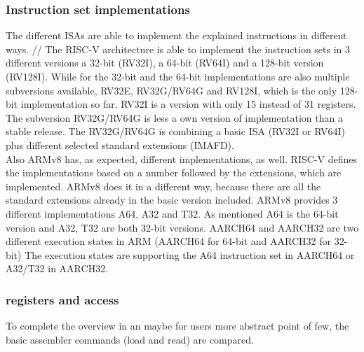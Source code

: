 \documentclass[conference]{IEEEtran}
\begin{document}
\subsubsection{Instruction set implementations}
The different \glspl{ISA} are able to implement the explained instructions in different ways.
// The RISC-V architecture is able to implement the instruction sets in 3 different versions a 32-bit (RV32I), a 64-bit (RV64I) and a 128-bit version (RV128I).
While for the 32-bit and the 64-bit implementations are also multiple subversions available, RV32E, RV32G/RV64G and RV128I, which is the only 128-bit implementation so far. RV32I is a version with only 15 instead of 31 registers. The subversion RV32G/RV64G is less a own version of implementation than a stable release. The RV32G/RV64G is combining a basic \gls{ISA} (RV32I or RV64I) plus different selected standard extensions (IMAFD). \cite{Asanovic2016} \\
Also ARMv8 has, as expected, different implementations, as well. RISC-V defines the implementations based on a number followed by the extensions, which are implemented. ARMv8 does it in a different way, because there are all the standard extensions already in the basic version included.
ARMv8 provides 3 different implementations A64, A32 and T32. As mentioned A64 is the 64-bit version and A32, T32  are both 32-bit versions.
AARCH64 and AARCH32 are two different execution states in ARM (AARCH64 for 64-bit and AARCH32 for 32-bit) The execution states are supporting the A64 instruction set in AARCH64 or A32/T32 in AARCH32.\cite{ArmManual}\\

\subsubsection{registers and access}
To complete the overview in an maybe for users more abstract point of few, the basic assembler commands (load and read) are compared.\\
\end{document}
